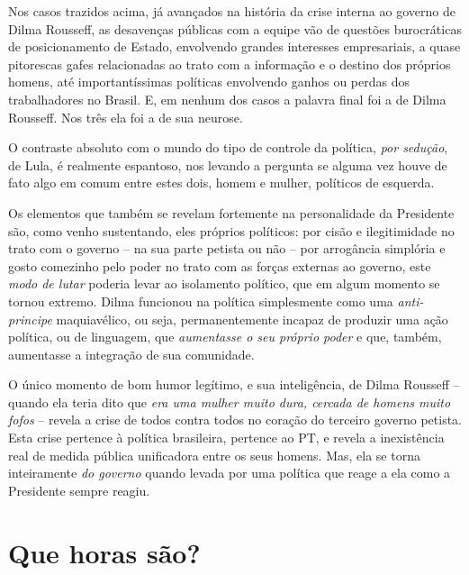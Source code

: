 Nos casos trazidos acima, já avançados na história da crise interna ao
governo de Dilma Rousseff, as desavenças públicas com a equipe vão de
questões burocráticas de posicionamento de Estado, envolvendo grandes
interesses empresariais, a quase pitorescas gafes relacionadas ao trato
com a informação e o destino dos próprios homens, até importantíssimas
políticas envolvendo ganhos ou perdas dos trabalhadores no Brasil. E, em
nenhum dos casos a palavra final foi a de Dilma Rousseff. Nos três ela
foi a de sua neurose.

O contraste absoluto com o mundo do tipo de controle da política,
\emph{por sedução}, de Lula, é realmente espantoso, nos levando a
pergunta se alguma vez houve de fato algo em comum entre estes dois,
homem e mulher, políticos de esquerda.

Os elementos que também se revelam fortemente na personalidade da
Presidente são, como venho sustentando, eles próprios políticos: por
cisão e ilegitimidade no trato com o governo -- na sua parte petista ou
não -- por arrogância simplória e gosto comezinho pelo poder no trato
com as forças externas ao governo, este \emph{modo de lutar} poderia
levar ao isolamento político, que em algum momento se tornou extremo.
Dilma funcionou na política simplesmente como uma \emph{anti-principe}
maquiavélico, ou seja, permanentemente incapaz de produzir uma ação
política, ou de linguagem, que \emph{aumentasse o seu próprio poder} e
que, também, aumentasse a integração de sua comunidade.

O único momento de bom humor legítimo, e sua inteligência, de Dilma
Rousseff -- quando ela teria dito que \emph{era uma mulher muito dura,
cercada de homens muito fofos} -- revela a crise de todos contra todos
no coração do terceiro governo petista. Esta crise pertence à política
brasileira, pertence ao PT, e revela a inexistência real de medida
pública unificadora entre os seus homens. Mas, ela se torna inteiramente
\emph{do governo} quando levada por uma política que reage a ela como a
Presidente sempre reagiu.

  \section{Que horas são?}\label{que-horas-suxe3o}

